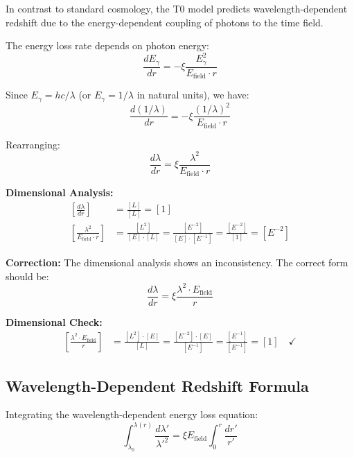 \documentclass[12pt,a4paper]{report}
\begin{document}
	In contrast to standard cosmology, the T0 model predicts wavelength-dependent redshift due to the energy-dependent coupling of photons to the time field.
	
	The energy loss rate depends on photon energy:
	\begin{equation}
		\frac{dE_\gamma}{dr} = -\xi \frac{E_\gamma^2}{E_{\text{field}} \cdot r}
	\end{equation}
	
	Since $E_\gamma = hc/\lambda$ (or $E_\gamma = 1/\lambda$ in natural units), we have:
	\begin{equation}
		\frac{d(1/\lambda)}{dr} = -\xi \frac{(1/\lambda)^2}{E_{\text{field}} \cdot r}
	\end{equation}
	
	Rearranging:
	\begin{equation}
		\frac{d\lambda}{dr} = \xi \frac{\lambda^2}{E_{\text{field}} \cdot r}
	\end{equation}
	
	\textbf{Dimensional Analysis:}
	\begin{align}
		\left[\frac{d\lambda}{dr}\right] &= \frac{[L]}{[L]} = [1] \\
		\left[\frac{\lambda^2}{E_{\text{field}} \cdot r}\right] &= \frac{[L^2]}{[E] \cdot [L]} = \frac{[E^{-2}]}{[E] \cdot [E^{-1}]} = \frac{[E^{-2}]}{[1]} = [E^{-2}]
	\end{align}
	
	\textbf{Correction:} The dimensional analysis shows an inconsistency. The correct form should be:
	\begin{equation}
		\frac{d\lambda}{dr} = \xi \frac{\lambda^2 \cdot E_{\text{field}}}{r}
	\end{equation}
	
	\textbf{Dimensional Check:}
	\begin{align}
		\left[\frac{\lambda^2 \cdot E_{\text{field}}}{r}\right] &= \frac{[L^2] \cdot [E]}{[L]} = \frac{[E^{-2}] \cdot [E]}{[E^{-1}]} = \frac{[E^{-1}]}{[E^{-1}]} = [1] \quad \checkmark
	\end{align}
	
	\subsection{Wavelength-Dependent Redshift Formula}
	\label{subsec:wavelength_dependent_redshift_formula}
	
	Integrating the wavelength-dependent energy loss equation:
	\begin{equation}
		\int_{\lambda_0}^{\lambda(r)} \frac{d\lambda'}{\lambda'^2} = \xi E_{\text{field}} \int_0^r \frac{dr'}{r'}
	\end{equation}
	
\end{document}
